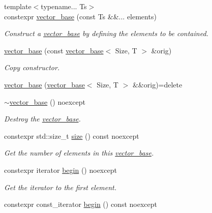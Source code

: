 \begin{DoxyCompactItemize}
\item 
{\footnotesize template$<$typename... Ts$>$ }\\constexpr \hyperlink{classglpp_1_1vector__base_a0345201763018059c125bdea2e98685d}{vector\+\_\+base} (const Ts \&\&... elements)
\begin{DoxyCompactList}\small\item\em Construct a \hyperlink{classglpp_1_1vector__base}{vector\+\_\+base} by defining the elements to be contained. \end{DoxyCompactList}\item 
\hyperlink{classglpp_1_1vector__base_a9db979f6c03649746213794d289189bf}{vector\+\_\+base} (const \hyperlink{classglpp_1_1vector__base}{vector\+\_\+base}$<$ Size, T $>$ \&orig)
\begin{DoxyCompactList}\small\item\em Copy constructor. \end{DoxyCompactList}\item 
\hyperlink{classglpp_1_1vector__base_af7bae140051531bc4905f8059ca7c22e}{vector\+\_\+base} (\hyperlink{classglpp_1_1vector__base}{vector\+\_\+base}$<$ Size, T $>$ \&\&orig)=delete
\item 
\hyperlink{classglpp_1_1vector__base_aa739db55ea041fd36860393ffa0c0650}{$\sim$vector\+\_\+base} () noexcept
\begin{DoxyCompactList}\small\item\em Destroy the \hyperlink{classglpp_1_1vector__base}{vector\+\_\+base}. \end{DoxyCompactList}\item 
constexpr std\+::size\+\_\+t \hyperlink{classglpp_1_1vector__base_a51861a7d1ee8e050e60d804b1fdfa4b8}{size} () const noexcept
\begin{DoxyCompactList}\small\item\em Get the number of elements in this \hyperlink{classglpp_1_1vector__base}{vector\+\_\+base}. \end{DoxyCompactList}\item 
constexpr iterator \hyperlink{classglpp_1_1vector__base_af9bf222e1947fe23a560b7e7c8f574a4}{begin} () noexcept
\begin{DoxyCompactList}\small\item\em Get the iterator to the first element. \end{DoxyCompactList}\item 
constexpr const\+\_\+iterator \hyperlink{classglpp_1_1vector__base_aecc2185fb26c757f0ceeadcd256df992}{begin} () const noexcept

\end{DoxyCompactItemize}
